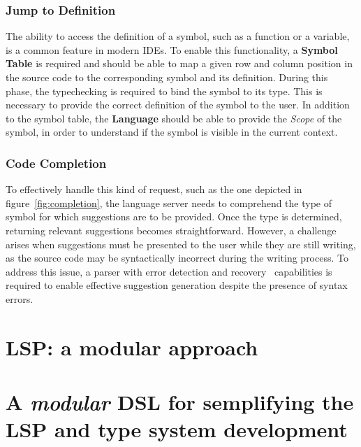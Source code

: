 \subsubsection{Jump to Definition}\label{subsubsec:concept:JumpToDefinition}
The ability to access the definition of a symbol, such as a function or a variable, is a common feature in modern IDEs.
To enable this functionality, a \textbf{Symbol Table} is required and should be able to map a given row and column position in the source code to the corresponding symbol and its definition.
During this phase, the typechecking is required to bind the symbol to its type. This is necessary to provide the correct definition of the symbol to the user.
In addition to the symbol table, the \textbf{Language} should be able to provide the \textit{Scope} of the symbol, in order to understand if the symbol is visible in the current context.

\subsubsection{Code Completion}\label{subsubsec:concept:CodeCompletion}

To effectively handle this kind of request, such as the one depicted in figure~\ref{fig:completion}, the language server needs to comprehend the type of symbol for which suggestions are to be provided. Once the type is determined, returning relevant suggestions becomes straightforward. However, a challenge arises when suggestions must be presented to the user while they are still writing, as the source code may be syntactically incorrect during the writing process. To address this issue, a parser with error detection and recovery~\cite{Graham79} capabilities is required to enable effective suggestion generation despite the presence of syntax errors.


\section{LSP: a modular approach}\label{sec:concept:LSPAModularApproach}


\section{A \textit{modular} DSL for semplifying the LSP and type system development}\label{sec:concept:AModularDSLForSemplifyingTheLSPAndTypeSystemDevelopment}

